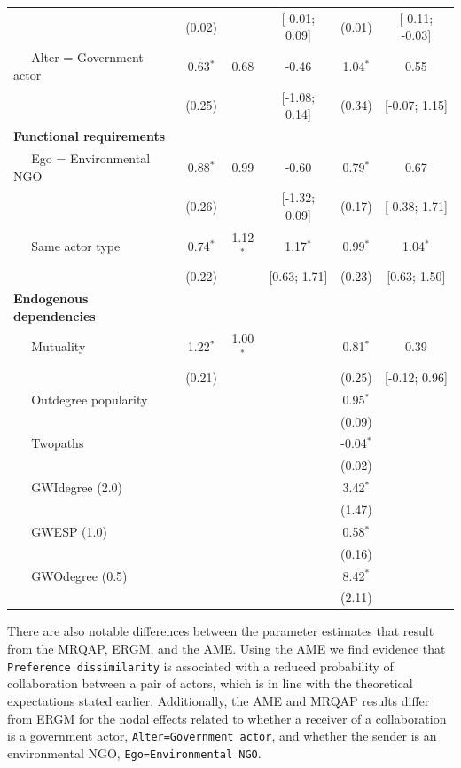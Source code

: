 \documentclass[9pt,twocolumn,twoside,lineno]{pnas-new}
\begin{document}
\begin{table}[ht]
\begin{tabular}{lccccc}
   & (0.02) &  & [-0.01; 0.09] & (0.01) & [-0.11; -0.03] \\
  $\;\;\;\;$ Alter = Government actor & 0.63$^{\ast}$ & 0.68 & -0.46 & 1.04$^{\ast}$ & 0.55 \\
   & (0.25) &  & [-1.08; 0.14] & (0.34) & [-0.07; 1.15] \\
  \textbf{Functional requirements} &  &  &  &  &  \\
  $\;\;\;\;$ Ego = Environmental NGO & 0.88$^{\ast}$ & 0.99 & -0.60 & 0.79$^{\ast}$ & 0.67 \\
   & (0.26) &  & [-1.32; 0.09] & (0.17) & [-0.38; 1.71] \\
  $\;\;\;\;$ Same actor type & 0.74$^{\ast}$ & 1.12$^{\ast}$ & 1.17$^{\ast}$ & 0.99$^{\ast}$ & 1.04$^{\ast}$ \\
   & (0.22) &  & [0.63; 1.71] & (0.23) & [0.63; 1.50] \\
  \textbf{Endogenous dependencies} &  &  &  &  &  \\
  $\;\;\;\;$ Mutuality & 1.22$^{\ast}$ & 1.00$^{\ast}$ &  & 0.81$^{\ast}$ & 0.39 \\
   & (0.21) &  &  & (0.25) & [-0.12; 0.96] \\
  $\;\;\;\;$ Outdegree popularity &  &  &  & 0.95$^{\ast}$ &  \\
   &  &  &  & (0.09) &  \\
  $\;\;\;\;$ Twopaths &  &  &  & -0.04$^{\ast}$ &  \\
   &  &  &  & (0.02) &  \\
  $\;\;\;\;$ GWIdegree (2.0) &  &  &  & 3.42$^{\ast}$ &  \\
   &  &  &  & (1.47) &  \\
  $\;\;\;\;$ GWESP (1.0) &  &  &  & 0.58$^{\ast}$ &  \\
   &  &  &  & (0.16) &  \\
  $\;\;\;\;$ GWOdegree (0.5) &  &  &  & 8.42$^{\ast}$ &  \\
   &  &  &  & (2.11) &  \\
   \hline
\hline
\end{tabular}
\endgroup
\label{tab:regTable}
\end{table}


There are also notable differences between the parameter estimates that result from the MRQAP, ERGM, and the AME. Using the AME we find evidence that \texttt{Preference dissimilarity} is associated with a reduced probability of collaboration between a pair of actors, which is in line with the theoretical expectations stated earlier. Additionally, the AME and MRQAP results differ from ERGM for the nodal effects related to whether a receiver of a collaboration is a government actor, \texttt{Alter=Government actor}, and whether the sender is an environmental NGO, \texttt{Ego=Environmental NGO}.
\end{document}
